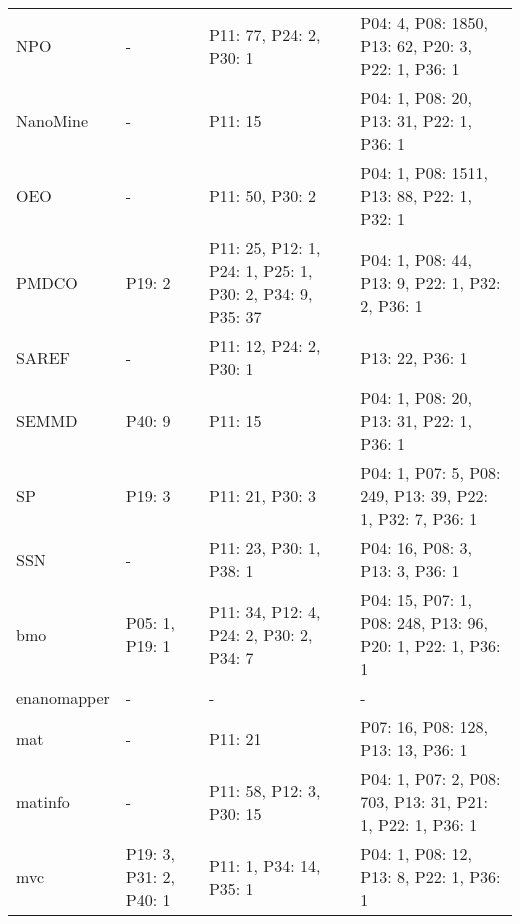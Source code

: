 \begin{tabular}{m{4cm}m{3cm}m{3cm}m{5cm}}
                    NPO &                       - &                                  P11: 77, P24: 2, P30: 1 &         P04: 4, P08: 1850, P13: 62, P20: 3, P22: 1, P36: 1 \\
               NanoMine &                       - &                                                  P11: 15 &                   P04: 1, P08: 20, P13: 31, P22: 1, P36: 1 \\
                    OEO &                       - &                                          P11: 50, P30: 2 &                 P04: 1, P08: 1511, P13: 88, P22: 1, P32: 1 \\
                  PMDCO &                  P19: 2 & P11: 25, P12: 1, P24: 1, P25: 1, P30: 2, P34: 9, P35: 37 &            P04: 1, P08: 44, P13: 9, P22: 1, P32: 2, P36: 1 \\
                  SAREF &                       - &                                  P11: 12, P24: 2, P30: 1 &                                            P13: 22, P36: 1 \\
                  SEMMD &                  P40: 9 &                                                  P11: 15 &                   P04: 1, P08: 20, P13: 31, P22: 1, P36: 1 \\
                     SP &                  P19: 3 &                                          P11: 21, P30: 3 &  P04: 1, P07: 5, P08: 249, P13: 39, P22: 1, P32: 7, P36: 1 \\
                    SSN &                       - &                                  P11: 23, P30: 1, P38: 1 &                            P04: 16, P08: 3, P13: 3, P36: 1 \\
                    bmo &          P05: 1, P19: 1 &                  P11: 34, P12: 4, P24: 2, P30: 2, P34: 7 & P04: 15, P07: 1, P08: 248, P13: 96, P20: 1, P22: 1, P36: 1 \\
            enanomapper &                       - &                                                        - &                                                          - \\
                    mat &                       - &                                                  P11: 21 &                         P07: 16, P08: 128, P13: 13, P36: 1 \\
                matinfo &                       - &                                 P11: 58, P12: 3, P30: 15 &  P04: 1, P07: 2, P08: 703, P13: 31, P21: 1, P22: 1, P36: 1 \\
                    mvc &  P19: 3, P31: 2, P40: 1 &                                  P11: 1, P34: 14, P35: 1 &                    P04: 1, P08: 12, P13: 8, P22: 1, P36: 1 \\

\end{tabular}
